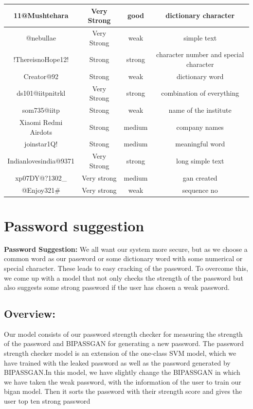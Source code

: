 \documentclass[runningheads]{llncs}
\begin{document}
\begin{table}[htb]
\begin{tabular}{||c||c||c||c||}
\hline
11@Mushtehara &Very Strong&good& dictionary character\\
\hline
@nebullae&Very Strong&weak& simple text\\
\hline
!ThereisnoHope12!&Strong&strong& character number and special character \\
\hline
Creator@92&Strong&weak& dictionary word\\
\hline
ds101@iitpnitrkl&Very Strong&strong& combination of everything\\
\hline
som735@iitp&Strong&weak& name of the institute\\
\hline
Xiaomi Redmi Airdots&Strong&medium& company names\\
\hline
joinstar1Q!&Strong&medium& meaningful word\\
\hline
Indianlovesindia@9371&Very Strong&strong& long simple text\\
\hline
xp07DY@?1302_&Very strong&medium& gan created\\
\hline
@Enjoy321#&Very strong&weak&sequence no\\
	\hline
	\hline
\end{tabular}

\end{table}


\section{Password suggestion}

\textbf{Password Suggestion: }We all want our system more secure, but as we choose a common word as our password or some dictionary word with some numerical or special character. These leads to easy cracking of the password. To overcome this, we come up with a model that not only checks the strength of the password but also suggests some strong password if the user has chosen a weak password.
\subsection{Overview: }Our model consists of our password strength checker for measuring the strength of the password and BIPASSGAN for generating a new password. The password strength checker model is an extension of the one-class SVM model, which we have trained with the leaked password as well as the password generated by BIPASSGAN.In this model, we have slightly change the BIPASSGAN in which we have taken the weak password, with the information of the user to train our bigan model. Then it sorts the password with their strength score and gives the user top ten strong password
\end{document}
